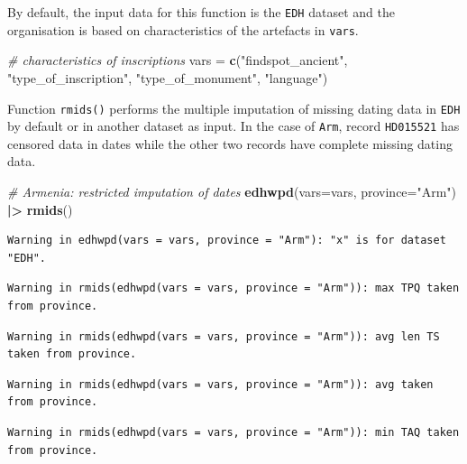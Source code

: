 \documentclass[a4paper,11pt]{memoir}
\newenvironment{Shaded}{\begin{snugshade}}{\end{snugshade}}
\newcommand{\CommentTok}[1]{\textcolor[rgb]{0.56,0.35,0.01}{\textit{#1}}}
\newcommand{\DataTypeTok}[1]{\textcolor[rgb]{0.13,0.29,0.53}{#1}}
\newcommand{\ErrorTok}[1]{\textcolor[rgb]{0.64,0.00,0.00}{\textbf{#1}}}
\newcommand{\KeywordTok}[1]{\textcolor[rgb]{0.13,0.29,0.53}{\textbf{#1}}}
\newcommand{\NormalTok}[1]{#1}
\newcommand{\OperatorTok}[1]{\textcolor[rgb]{0.81,0.36,0.00}{\textbf{#1}}}
\newcommand{\StringTok}[1]{\textcolor[rgb]{0.31,0.60,0.02}{#1}}
\begin{document}
By default, the input data for this function is the \texttt{EDH} dataset
and the organisation is based on characteristics of the artefacts in
\texttt{vars}.

\begin{Shaded}
\begin{Highlighting}[]
\CommentTok{# characteristics of inscriptions}
\NormalTok{vars =}\StringTok{ }\KeywordTok{c}\NormalTok{(}\StringTok{"findspot_ancient"}\NormalTok{, }\StringTok{"type_of_inscription"}\NormalTok{, }\StringTok{"type_of_monument"}\NormalTok{, }\StringTok{"language"}\NormalTok{)}
\end{Highlighting}
\end{Shaded}

Function \texttt{rmids()} performs the multiple imputation of missing
dating data in \texttt{EDH} by default or in another dataset as input.
In the case of \texttt{Arm}, record \texttt{HD015521} has censored data
in dates while the other two records have complete missing dating data.

\begin{Shaded}
\begin{Highlighting}[]
\CommentTok{# Armenia: restricted imputation of dates}
\KeywordTok{edhwpd}\NormalTok{(}\DataTypeTok{vars=}\NormalTok{vars, }\DataTypeTok{province=}\StringTok{"Arm"}\NormalTok{) }\OperatorTok{|}\ErrorTok{>}\StringTok{ }
\StringTok{  }\KeywordTok{rmids}\NormalTok{()}
\end{Highlighting}
\end{Shaded}

\begin{verbatim}
Warning in edhwpd(vars = vars, province = "Arm"): "x" is for dataset "EDH".
\end{verbatim}

\begin{verbatim}
Warning in rmids(edhwpd(vars = vars, province = "Arm")): max TPQ taken from province.
\end{verbatim}

\begin{verbatim}
Warning in rmids(edhwpd(vars = vars, province = "Arm")): avg len TS taken from province.
\end{verbatim}

\begin{verbatim}
Warning in rmids(edhwpd(vars = vars, province = "Arm")): avg taken from province.
\end{verbatim}

\begin{verbatim}
Warning in rmids(edhwpd(vars = vars, province = "Arm")): min TAQ taken from province.
\end{verbatim}
\end{document}
